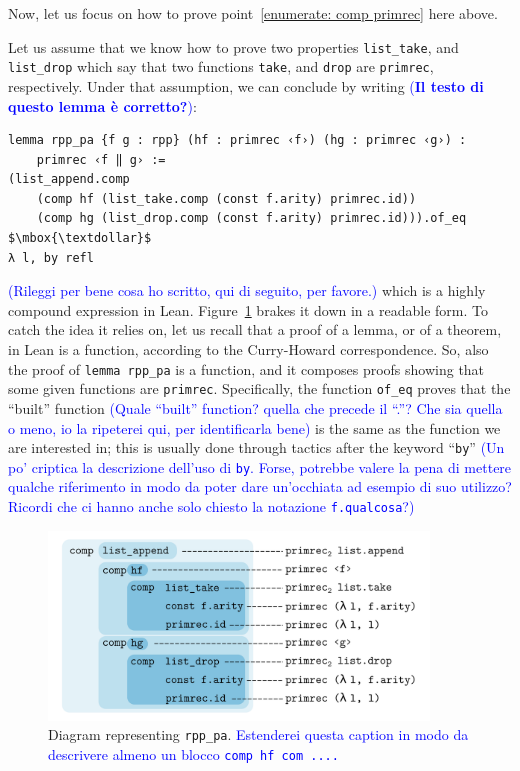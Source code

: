 \documentclass[preprint]{elsarticle}
\theoremstyle{remark}
\newcommand{\LEAN}{\textsf{Lean}\xspace}
\begin{document}
\vspace{\baselineskip}
Now, let us focus on how to prove point~\ref{enumerate: comp primrec} here above.

Let us assume that we know how to prove two properties \lstinline|list_take|, and \lstinline|list_drop| which say that two functions \lstinline|take|, and \lstinline|drop| are \lstinline|primrec|, respectively. Under that assumption, we can conclude by writing \textcolor{blue}{(\textbf{Il testo di questo lemma è corretto?})}:
\begin{lstlisting}
lemma rpp_pa {f g : rpp} (hf : primrec ‹f›) (hg : primrec ‹g›) :
    primrec ‹f ‖ g› :=
(list_append.comp
    (comp hf (list_take.comp (const f.arity) primrec.id))
    (comp hg (list_drop.comp (const f.arity) primrec.id))).of_eq $\mbox{\textdollar}$
λ l, by refl
\end{lstlisting}
\noindent
\textcolor{blue}{(Rileggi per bene cosa ho scritto, qui di seguito, per favore.)}
which is a highly compound expression in \LEAN. Figure~\ref{fig:rpp_pa} brakes it down in a readable form. To catch the idea it relies on, let us recall that a proof of a lemma, or of a theorem, in \LEAN is a function, according to the Curry-Howard correspondence. So, also the proof of \lstinline|lemma rpp_pa| is a function, and it composes proofs showing that some given functions are \lstinline|primrec|.
Specifically, the function \lstinline|of_eq| proves that the ``built'' function \textcolor{blue}{(Quale ``built'' function? quella che precede il ``.''? Che sia quella o meno, io la ripeterei qui, per identificarla bene)} is the same as the function we are interested in; this is usually done through tactics after the keyword ``\lstinline|by|'' \textcolor{blue}{(Un po' criptica la descrizione dell'uso di \texttt{by}. Forse, potrebbe valere la pena di mettere qualche riferimento in modo da poter dare un'occhiata ad esempio di suo utilizzo? Ricordi che ci hanno anche solo chiesto la notazione \texttt{f.qualcosa}?)}

\begin{figure}[H]
    \centering
    \includegraphics[width=0.9\textwidth]{drawing.png}
    \caption{Diagram representing \lstinline|rpp_pa|. \textcolor{blue}{Estenderei questa caption in modo da descrivere almeno un blocco \texttt{comp hf com ....}}}
    \label{fig:rpp_pa}
\end{figure}
\end{document}
